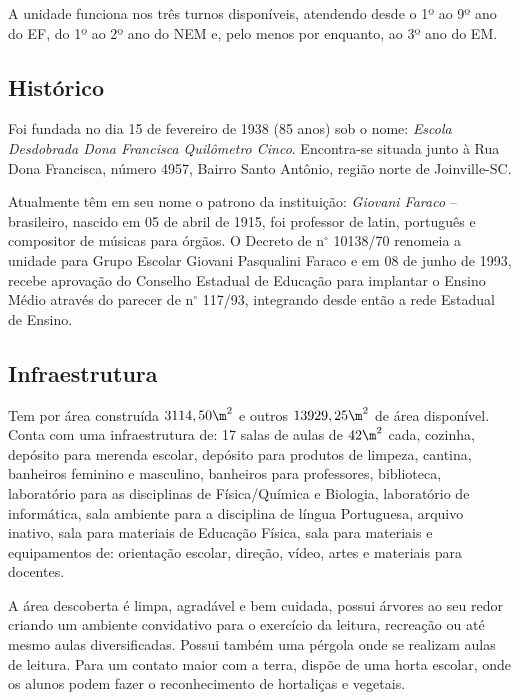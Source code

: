 A unidade funciona nos três turnos disponíveis, atendendo desde o 1º ao 9º ano do \ac{EF}, do 1º ao 2º ano do \ac{NEM} e, pelo menos por enquanto, ao 3º ano do \ac{EM}.

\subsection{Histórico} %
\label{sec:Histórico}
Foi fundada no dia 15 de fevereiro de 1938 (85 anos) sob o nome: \textit{Escola Desdobrada Dona Francisca Quilômetro Cinco}. Encontra-se situada junto à Rua Dona Francisca, número 4957, Bairro Santo Antônio, região norte de Joinville-SC. 

Atualmente têm em seu nome o patrono da instituição: \emph{Giovani Faraco} -- brasileiro, nascido em 05 de abril de 1915, foi professor de latin, português e compositor de músicas para órgãos. O Decreto de n$^\circ$ 10138/70 renomeia a unidade para Grupo Escolar Giovani Pasqualini Faraco e em 08 de junho de 1993, recebe aprovação do Conselho Estadual de Educação para implantar o Ensino Médio através do parecer de n$^\circ$ 117/93, integrando desde então a rede Estadual de Ensino.

\subsection{Infraestrutura} %
\label{sec:Infraestrutura}

Tem por área construída  $3114,50\m^2$ e outros $13929,25\m^2$ de área disponível. Conta com uma infraestrutura de: 17 salas de aulas de $42\m^2$ cada, cozinha, depósito para merenda escolar, depósito para produtos de limpeza, cantina, banheiros feminino e masculino, banheiros para professores, biblioteca, laboratório para as disciplinas de Física/Química e Biologia, laboratório de informática, sala ambiente para a disciplina de língua Portuguesa, arquivo inativo, sala para materiais de Educação Física, sala para materiais e equipamentos de: orientação escolar, direção, vídeo, artes e materiais para docentes.

A área descoberta é limpa, agradável e bem cuidada, possui árvores ao seu redor criando um ambiente convidativo para o exercício da leitura, recreação ou até mesmo aulas diversificadas. Possui também uma pérgola onde se realizam aulas de leitura. Para um contato maior com a terra, dispõe de uma horta escolar, onde os alunos podem fazer o reconhecimento de hortaliças e vegetais.

